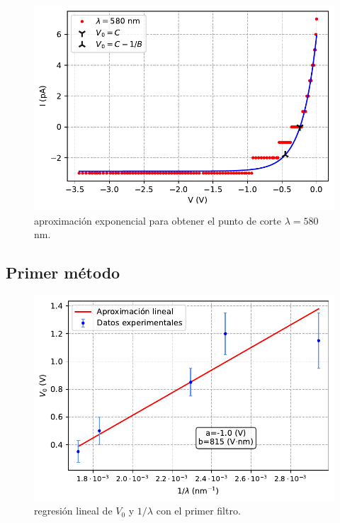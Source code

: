 \documentclass[12pt,a4paper]{article}
\numberwithin{equation}{section}
\numberwithin{table}{section}
\numberwithin{figure}{section}
\begin{document}
\begin{figure}[h!]  \centering
\includegraphics[scale=0.97]{Datos_exponencial_5.pdf}
\caption{aproximación exponencial para obtener el punto de corte $\lambda=580$ nm.}
\label{Fig:6.2.5}
\end{figure}
\subsection{Primer método}

\newpage

\begin{figure}[h!]  \centering
\includegraphics[scale=0.97]{Metodo_1-con.pdf}
\caption{regresión lineal de $V_0$ y $1/\lambda$ con el primer filtro.}
\label{Fig:6.3.1}
\end{figure}
\end{document}
